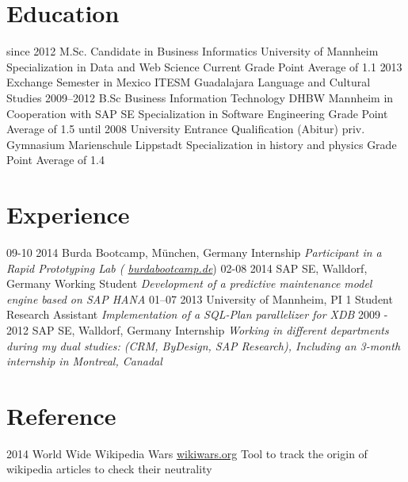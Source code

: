 \documentclass[a4paper]{friggeri-cv}
\begin{document}
\section{Education}

\begin{entrylist}
  \eduentry
    {since 2012}
    {M.Sc. Candidate in Business Informatics}
    {University of Mannheim}
    {Specialization in Data and Web Science}
    {Current Grade Point Average of 1.1}
   \entry
    {2013}
    {Exchange Semester in Mexico}
    {ITESM Guadalajara}
    {Language and Cultural Studies}
  \eduentry
    {2009–2012}
    {B.Sc Business Information Technology}
    {DHBW Mannheim in Cooperation with SAP SE}
    {Specialization in Software Engineering}
    { Grade Point Average of 1.5}
  \eduentry
    {until 2008}
    {University Entrance Qualification (Abitur)}
    {priv. Gymnasium Marienschule Lippstadt}
    {Specialization in history and physics}
    {Grade Point Average of 1.4}
\end{entrylist}

\section{Experience}

\begin{entrylist}
  \entry
    {09-10 2014}
    {Burda Bootcamp, München, Germany}
    {Internship}
    {\emph{Participant in a Rapid Prototyping Lab ( \href{http://burdabootcamp.de}{burdabootcamp.de}})}
  \entry
    {02-08 2014}
    {SAP SE, Walldorf, Germany}
    {Working Student}
    {\emph{Development of a predictive maintenance model engine based on SAP HANA}}
  \entry
    {01–07 2013}
    {University of Mannheim, PI 1}
    {Student Research Assistant}
    {\emph{Implementation of a SQL-Plan parallelizer for XDB}}
  \entry
    {2009 - 2012}
    {SAP SE, Walldorf, Germany}
    {Internship}
    {\emph{Working in different departments during my dual studies: (CRM, ByDesign, SAP Research), Including an 3-month internship in Montreal, Canadal}}
\end{entrylist}

\section{Reference}

\begin{entrylist}
  \entry
    {2014}
    {World Wide Wikipedia Wars}
    {\href{http://wikiwars.org}{wikiwars.org}}
    {Tool to track the origin of wikipedia articles to check their neutrality}
\end{entrylist}
\end{document}

